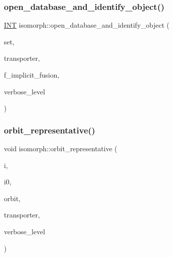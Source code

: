 \mbox{\label{classisomorph_aa4e387f26f609fc9379d2e01f6cc27d0}} 
\subsubsection{\texorpdfstring{open\+\_\+database\+\_\+and\+\_\+identify\+\_\+object()}{open\_database\_and\_identify\_object()}}
{\footnotesize\ttfamily \mbox{\hyperlink{galois_8h_a09fddde158a3a20bd2dcadb609de11dc}{I\+NT}} isomorph\+::open\+\_\+database\+\_\+and\+\_\+identify\+\_\+object (\begin{DoxyParamCaption}\item[{\mbox{\hyperlink{galois_8h_a09fddde158a3a20bd2dcadb609de11dc}{I\+NT}} $\ast$}]{set,  }\item[{\mbox{\hyperlink{galois_8h_a09fddde158a3a20bd2dcadb609de11dc}{I\+NT}} $\ast$}]{transporter,  }\item[{\mbox{\hyperlink{galois_8h_a09fddde158a3a20bd2dcadb609de11dc}{I\+NT}}}]{f\+\_\+implicit\+\_\+fusion,  }\item[{\mbox{\hyperlink{galois_8h_a09fddde158a3a20bd2dcadb609de11dc}{I\+NT}}}]{verbose\+\_\+level }\end{DoxyParamCaption})}

\mbox{\label{classisomorph_acdfd35e2cb33942945e10dedeb4a210f}} 
\subsubsection{\texorpdfstring{orbit\+\_\+representative()}{orbit\_representative()}}
{\footnotesize\ttfamily void isomorph\+::orbit\+\_\+representative (\begin{DoxyParamCaption}\item[{\mbox{\hyperlink{galois_8h_a09fddde158a3a20bd2dcadb609de11dc}{I\+NT}}}]{i,  }\item[{\mbox{\hyperlink{galois_8h_a09fddde158a3a20bd2dcadb609de11dc}{I\+NT}} \&}]{i0,  }\item[{\mbox{\hyperlink{galois_8h_a09fddde158a3a20bd2dcadb609de11dc}{I\+NT}} \&}]{orbit,  }\item[{\mbox{\hyperlink{galois_8h_a09fddde158a3a20bd2dcadb609de11dc}{I\+NT}} $\ast$}]{transporter,  }\item[{\mbox{\hyperlink{galois_8h_a09fddde158a3a20bd2dcadb609de11dc}{I\+NT}}}]{verbose\+\_\+level }\end{DoxyParamCaption})}

